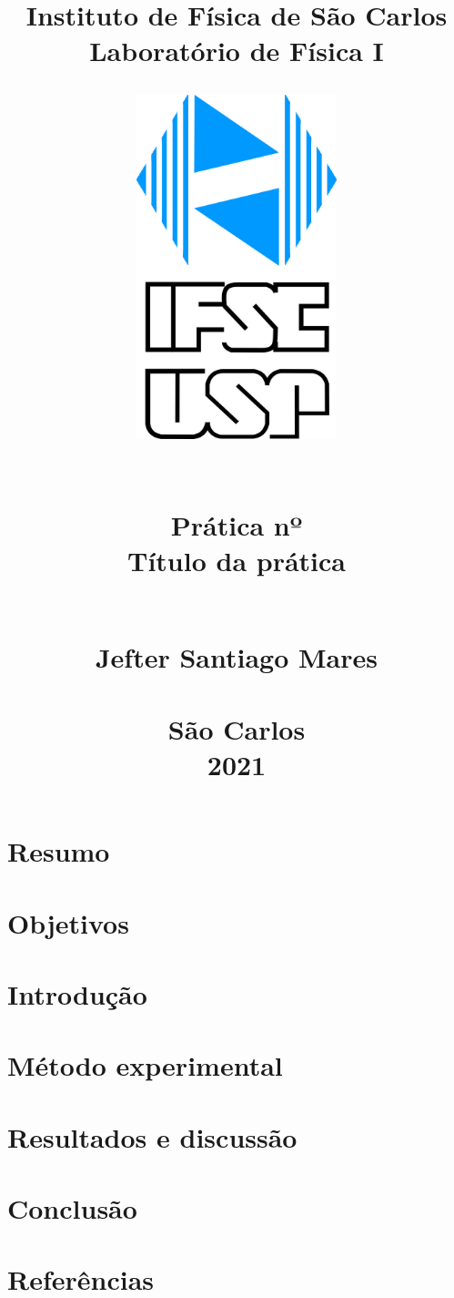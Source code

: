 \documentclass[a4paper, 12pt]{article}
\title{
   \begin{center}
        \Huge{
        \textbf{Instituto de Física de São Carlos \\
        Laboratório de Física I}
        \vspace{1em}
        \begin{figure}[h]
  \begin{center}
      \includegraphics[width=6cm, height=10cm]{ifsc-logo.jpg}
   \end{center}
\end{figure}
       \vspace{0.5em} \\
        \Large{Prática nº}
        \vspace{0.5em} \\
       \large{ Título da prática}
        }
        \vspace*{\fill}
        \large{
        \\
        Jefter Santiago Mares \\
        }
        \vspace*{\fill}
      \\São Carlos \\  2021
\newpage
\end{center}}
\date{}
\begin{document}
\maketitle
\section{Resumo}
\section{Objetivos}
\section{Introdução}
\section{Método experimental}
\section{Resultados e discussão}
\section{Conclusão}
\section{Referências}
\end{document}
